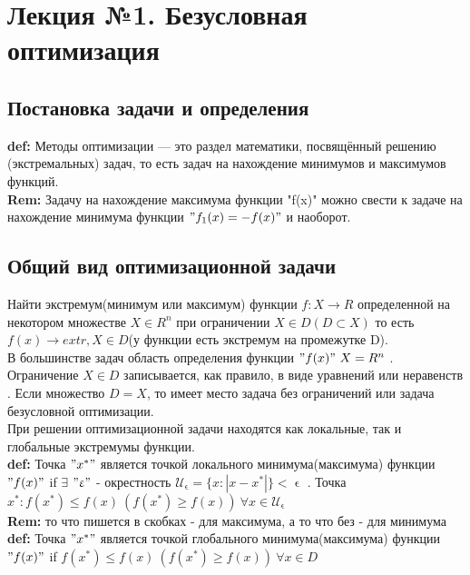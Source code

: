 \documentclass[a4paper]{article}
\begin{document}
\Large %
\setlength{\baselineskip}{25pt}
\section*{Лекция №1. Безусловная оптимизация}
\subsection*{Постановка задачи и определения}

\textbf{def:} Методы оптимизации --- это раздел математики, посвящённый решению (экстремальных) задач, то есть задач на нахождение минимумов и максимумов функций.\\ [2mm]
\textbf{Rem:} Задачу на нахождение максимума функции "f(x)" можно свести к задаче на нахождение минимума функции $"f_1(x) = -f(x)"$ и наоборот.
\subsection*{Общий вид оптимизационной задачи}
Найти экстремум(минимум или максимум) функции $f: X \rightarrow R$ определенной на некотором множестве $X \in R^n$ при ограничении $X \in D (D \subset X)$ то есть $f(x) \rightarrow extr, X\in D$(у функции есть экстремум на промежутке D).\\
В большинстве задач область определения функции $"f(x)" \  X=R^n$ . Ограничение $X\in D$ записывается, как правило, в виде уравнений или неравенств . Если множество $D=X$, то имеет место задача без ограничений или {задача безусловной оптимизации}. \\
При решении оптимизационной задачи находятся как {локальные}, так и {глобальные экстремумы функции}. \\[2mm]
\textbf{def:} Точка $" x^* "$ является точкой {локального минимума(максимума) функции} $"f(x)" $ if $ \exists$ $"\upvarepsilon "$ - окрестность $ \mathcal{U}_ \upvarepsilon = \{ x :  |x-x^*| \} < \upvarepsilon $ .
Точка $x^* : f(x^*) \leq f(x) \  (f(x^*) \geq f(x)) \ \forall x \in \mathcal{U}_ \upvarepsilon $ \\ [2mm]
\textbf{Rem:} то что пишется в скобках - для максимума, а то что без - для минимума \\ [2mm]
\textbf{def:} Точка $"x^*" $ является точкой {глобального минимума(максимума)} функции $"f(x)"$ if $ f(x^*) \leq f(x) \  (f(x^*) \geq f(x)) \  \forall x \in D $
\newpage
\end{document}
